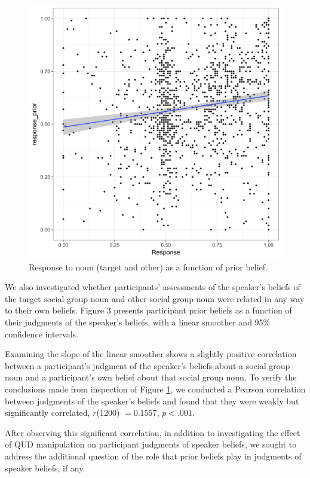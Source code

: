 \documentclass[11pt,a4paper]{article}
\begin{document}
\begin{figure}[h]
\includegraphics[width=\linewidth]{priors_responses.png}
\caption{Response to noun (target and other) as a function of prior belief.}
\label{priors}
\end{figure}

We also investigated whether participants' assessments of the speaker's beliefs of the target social group noun and other social group noun were related in any way to their own beliefs. Figure 3 presents participant prior beliefs as a function of their judgments of the speaker's beliefs, with a linear smoother and 95\% confidence intervals. 

Examining the slope of the linear smoother shows a slightly positive correlation between a participant's judgment of the speaker's beliefs about a social group noun and a participant's own belief about that social group noun. To verify the conclusions made from inspection of Figure \ref{priors}, we conducted a Pearson correlation between judgments of the speaker's beliefs and found that they were weakly but significantly correlated, $r$(1200) $= 0.1557$, $p < .001$.

After observing this significant correlation, in addition to investigating the effect of QUD manipulation on participant judgments of speaker beliefs, we sought to address the additional question of the role that prior beliefs play in judgments of speaker beliefs, if any.  
\end{document}
